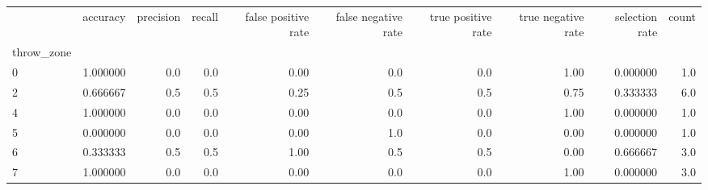 \begin{tabular}{lrrrrrrrrr}
\toprule
{} &  accuracy &  precision &  recall &  false positive rate &  false negative rate &  true positive rate &  true negative rate &  selection rate &  count \\
throw\_zone &           &            &         &                      &                      &                     &                     &                 &        \\
\midrule
0          &  1.000000 &        0.0 &     0.0 &                 0.00 &                  0.0 &                 0.0 &                1.00 &        0.000000 &    1.0 \\
2          &  0.666667 &        0.5 &     0.5 &                 0.25 &                  0.5 &                 0.5 &                0.75 &        0.333333 &    6.0 \\
4          &  1.000000 &        0.0 &     0.0 &                 0.00 &                  0.0 &                 0.0 &                1.00 &        0.000000 &    1.0 \\
5          &  0.000000 &        0.0 &     0.0 &                 0.00 &                  1.0 &                 0.0 &                0.00 &        0.000000 &    1.0 \\
6          &  0.333333 &        0.5 &     0.5 &                 1.00 &                  0.5 &                 0.5 &                0.00 &        0.666667 &    3.0 \\
7          &  1.000000 &        0.0 &     0.0 &                 0.00 &                  0.0 &                 0.0 &                1.00 &        0.000000 &    3.0 \\
\bottomrule
\end{tabular}
